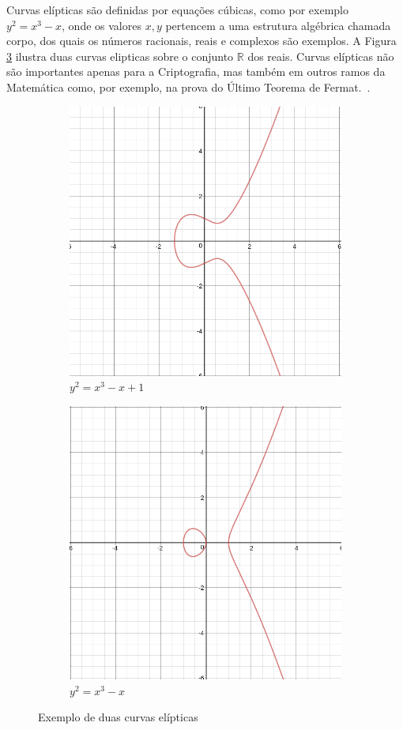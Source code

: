 \documentclass{SBCbookchapter}
\begin{document}
Curvas elípticas são definidas por equações cúbicas, como por exemplo $y^2 = x^3 - x$, onde os valores $x,y$ pertencem a uma estrutura algébrica chamada corpo, dos quais os números racionais, reais e complexos são exemplos. A Figura \ref{fig:curvas} ilustra duas curvas elipticas sobre o conjunto $\mathbb{R}$ dos reais. Curvas elípticas não são  importantes apenas para a Criptografia, mas também em outros ramos da Matemática como, por exemplo, na  prova do Último Teorema de Fermat.~\cite{Hankerson:2003:GEC:940321}.
\begin{figure}[htpb]
\centering
\begin{subfigure}{.5\textwidth}
  \centering
  \includegraphics[width=.6\linewidth]{figures/curve1.png}
  \caption{$y^2 = x^3 -x + 1$}
  \label{fig:sub1}
\end{subfigure}%
\begin{subfigure}{.5\textwidth}
  \centering
  \includegraphics[width=.6\linewidth]{figures/curve2.png}
  \caption{$y^2 = x^3 - x$}
  \label{fig:sub2}
\end{subfigure}
\caption{Exemplo de duas curvas elípticas}
\label{fig:curvas}
\end{figure}
\end{document}
